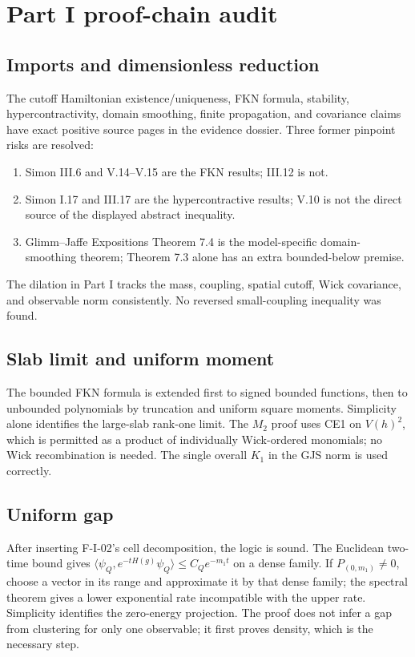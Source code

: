 \documentclass[11pt,a4paper]{article}
\begin{document}
\section{Part I proof-chain audit}

\subsection{Imports and dimensionless reduction}

The cutoff Hamiltonian existence/uniqueness, FKN formula, stability, hypercontractivity,
domain smoothing, finite propagation, and covariance claims have exact positive source
pages in the evidence dossier.  Three former pinpoint risks are resolved:

\begin{enumerate}
\item Simon III.6 and V.14--V.15 are the FKN results; III.12 is not.
\item Simon I.17 and III.17 are the hypercontractive results; V.10 is not the direct
source of the displayed abstract inequality.
\item Glimm--Jaffe Expositions Theorem 7.4 is the model-specific domain-smoothing theorem;
Theorem 7.3 alone has an extra bounded-below premise.
\end{enumerate}

The dilation in Part I tracks the mass, coupling, spatial cutoff, Wick covariance, and
observable norm consistently.  No reversed small-coupling inequality was found.

\subsection{Slab limit and uniform moment}

The bounded FKN formula is extended first to signed bounded functions, then to unbounded
polynomials by truncation and uniform square moments.  Simplicity alone identifies the
large-slab rank-one limit.  The $M_2$ proof uses CE1 on $V(h)^2$, which is permitted as a
product of individually Wick-ordered monomials; no Wick recombination is needed.  The
single overall $K_1$ in the GJS norm is used correctly.

\subsection{Uniform gap}

After inserting F-I-02's cell decomposition, the logic is sound.  The Euclidean two-time
bound gives
$\langle\psi_Q,e^{-tH(g)}\psi_Q\rangle\le C_Qe^{-m_1t}$ on a dense family.
If $P_{(0,m_1)}\ne0$, choose a vector in its range and approximate it by that dense
family; the spectral theorem gives a lower exponential rate incompatible with the
upper rate.  Simplicity identifies the zero-energy projection.  The proof does not infer
a gap from clustering for only one observable; it first proves density, which is the
necessary step.
\end{document}
